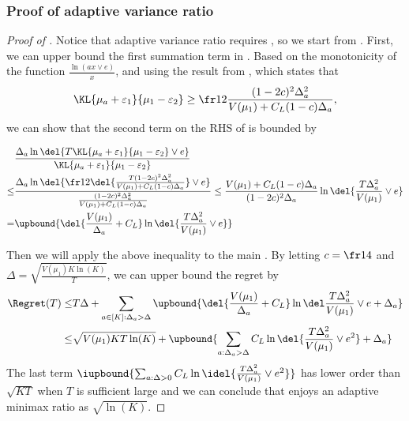 \subsubsection{Proof of adaptive variance ratio}
\begin{proof}[Proof of ]
    Notice that adaptive variance ratio requires , so we start from . First, we can upper bound the first summation term in . Based on the monotonicity of the function $\tfrac{\ln(ax \vee e)}{x}$, and using the result from , which states that 
    \[
    \KL{\mu_a + \varepsilon_1}{\mu_1 - \varepsilon_2} \geq \fr12 \frac{(1-2c)^2 \Delta_a^2}{V(\mu_1) + C_L(1-c)\Delta_a},
    \]
    we can show that the second term on the RHS of  is bounded by 
 
    \begin{align}
        &
        \frac{\Delta_a\ln\del{T\KL{\mu_a+\varepsilon_1}{\mu_1-\varepsilon_2} \vee e}}{\KL{\mu_a+\varepsilon_1}{\mu_1-\varepsilon_2}}
            \nonumber
        \\
        \leq&
        \frac{\Delta_a\ln\del{ \fr12\del{\frac{T(1-2c)^2\Delta_a^2}{V(\mu_1) + C_L(1-c)\Delta_a}} \vee e}}{\frac{(1-2c)^2\Delta_a^2}{V(\mu_1) + C_L(1-c)\Delta_a}}
        \leq
            \frac{V(\mu_1) + C_L(1-c)\Delta_a}{(1-2c)^2 \Delta_a}\ln\del{\frac{T\Delta_a^2}{V(\mu_1)} \vee e}
            \nonumber
        \\
        =&
        \upbound{\del{\frac{V(\mu_1)}{\Delta_a} + C_L}\ln\del{\frac{T\Delta_a^2}{V(\mu_1)} \vee e}}
    \end{align}

    Then we will apply the above inequality to the main . By letting $c = \fr14$ and $\Delta = \sqrt{\tfrac{V(\mu_1)K \ln(K)}{T}}$, we can upper bound the regret by
    \begin{align*}
        \Regret(T)
        \leq&
        T\Delta + \sum_{a\in[K]:\Delta_a > \Delta} \upbound{\del{\frac{V(\mu_1)}{\Delta_a} + C_L} \LogFactorInRegretBound + \Delta_a}
        \\
        \leq&
        \sqrt{V(\mu_1) K T \ln(K)} +
        \upbound{\sum_{a:\Delta_a>\Delta} C_L \ln\del{\frac{T\Delta_a^2}{V(\mu_1)} \vee e^2} + \Delta_a}
    \end{align*}
    The last term $\iupbound{ \sum_{a:\Delta>0} C_L \ln\idel{\frac{T\Delta_a^2}{V(\mu_1)} \vee e^2}}$ has lower order than $\sqrt{KT}$ when $T$ is sufficient large and we can conclude that \expklms enjoys an adaptive minimax ratio as $\sqrt{\ln(K)}$.
\end{proof}

